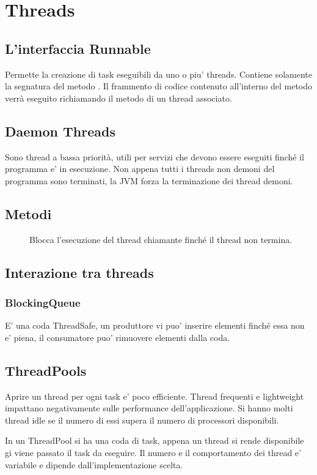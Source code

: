 \chapter{Threads}
\section{L'interfaccia Runnable}
Permette la creazione di task eseguibili da uno o piu' threads.
Contiene solamente la segnatura del metodo .
Il frammento di codice contenuto all'interno del metodo  verrà eseguito richiamando il metodo  di un thread associato.
\section{Daemon Threads}
Sono thread a bassa priorità, utili per servizi che devono essere eseguiti finché il programma e' in esecuzione.
Non appena tutti i threads non demoni del programma sono terminati, la JVM forza la terminazione dei thread demoni.
\section{Metodi}
\begin{description}
    \item[] Blocca l'esecuzione del thread chiamante finché il thread  non termina.
\end{description}
\section{Interazione tra threads}
\subsection{BlockingQueue}
E' una coda ThreadSafe, un produttore vi puo' inserire elementi finché essa non e' piena, il consumatore puo' rimuovere elementi dalla coda.
\section{ThreadPools}
Aprire un thread per ogni task e' poco efficiente.
Thread frequenti e lightweight impattano negativamente sulle performance dell'applicazione.
Si hanno molti thread idle se il numero di essi supera il numero di processori disponibili.

In un ThreadPool si ha una coda di task, appena un thread si rende disponibile gi viene passato il task da eseguire.
Il numero e il comportamento dei thread e' variabile e dipende dall'implementazione scelta.
